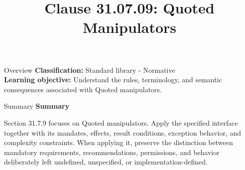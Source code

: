\documentclass[10pt,letterpaper]{article}
\title{Clause 31.07.09: Quoted Manipulators}
\author{}
\date{}
\begin{document}
\maketitle
\begin{CornellOverviewBox}{Overview}
\textbf{Classification:} Standard library - Normative\\[2pt]
\textbf{Learning objective:} Understand the rules, terminology, and semantic consequences associated with Quoted manipulators.
\end{CornellOverviewBox}\begin{CornellSummaryBox}{Summary}
{\sffamily\bfseries\color{Accent} Summary}\par\vspace{3pt}Section 31.7.9 focuses on Quoted manipulators. Apply the specified interface together with its mandates, effects, result conditions, exception behavior, and complexity constraints. When applying it, preserve the distinction between mandatory requirements, recommendations, permissions, and behavior deliberately left undefined, unspecified, or implementation-defined.
\end{CornellSummaryBox}
\end{document}
